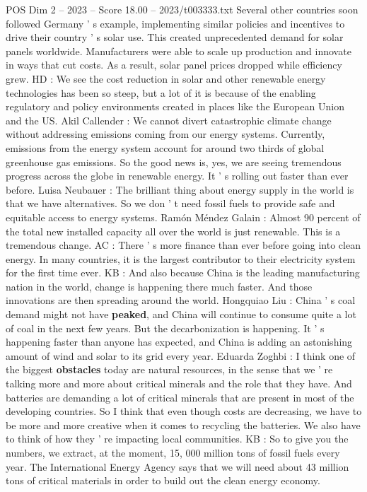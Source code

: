 \begin{textsample}{POS Dim 2 – 2023 – Score 18.00 – 2023/t003333.txt}
Several other countries soon followed Germany ' s example, implementing similar policies and incentives to drive their country ' s solar use.
This created unprecedented demand for solar panels worldwide.
Manufacturers were able to scale up production and innovate in ways that cut costs.
As a result, solar panel prices dropped while efficiency grew.
HD : We see the cost reduction in solar and other renewable energy technologies has been so steep, but a lot of it is because of the enabling regulatory and policy environments created in places like the European Union and the US.
Akil Callender : We cannot divert catastrophic climate change without addressing emissions coming from our energy systems.
Currently, emissions from the energy system account for around two thirds of global greenhouse gas emissions.
So the good news is, yes, we are seeing tremendous progress across the globe in renewable energy.
It ' s rolling out faster than ever before.
Luisa Neubauer : The brilliant thing about energy supply in the world is that we have alternatives.
So we don ' t need fossil fuels to provide safe and equitable access to energy systems.
Ramón Méndez Galain : Almost 90 percent of the total new installed capacity all over the world is just renewable.
This is a tremendous change.
AC : There ' s more finance than ever before going into clean energy.
In many countries, it is the largest contributor to their electricity system for the first time ever.
KB : And also because China is the leading manufacturing nation in the world, change is happening there much faster.
And those innovations are then spreading around the world.
Hongquiao Liu : China ' s coal demand might not have \textbf{peaked}, and China will continue to consume quite a lot of coal in the next few years.
But the decarbonization is happening.
It ' s happening faster than anyone has expected, and China is adding an astonishing amount of wind and solar to its grid every year.
Eduarda Zoghbi : I think one of the biggest \textbf{obstacles} today are natural resources, in the sense that we ' re talking more and more about critical minerals and the role that they have.
And batteries are demanding a lot of critical minerals that are present in most of the developing countries.
So I think that even though costs are decreasing, we have to be more and more creative when it comes to recycling the batteries.
We also have to think of how they ' re impacting local communities.
KB : So to give you the numbers, we extract, at the moment, 15, 000 million tons of fossil fuels every year.
The International Energy Agency says that we will need about 43 million tons of critical materials in order to build out the clean energy economy.

\end{textsample}
